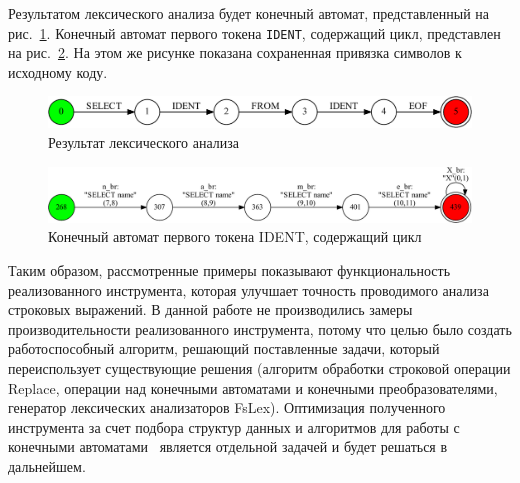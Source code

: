 Результатом лексического анализа будет конечный автомат, представленный на рис.~\ref{fig:TokenEx}. Конечный автомат первого токена \verb|IDENT|, содержащий цикл, представлен на рис.~\ref{fig:token}. На этом же рисунке показана сохраненная привязка символов к исходному коду. 
\begin{figure}[H]
\begin{center}
\includegraphics[width=1.0\textwidth]{Polubelova/TokenEx}
\caption{Результат лексического анализа}
\label{fig:TokenEx} 
\end{center}
\end{figure}
\begin{figure}[H]
\begin{center}
\includegraphics[width=1.0\textwidth]{Polubelova/token}
\caption{Конечный автомат первого токена IDENT, содержащий цикл}
\label{fig:token} 
\end{center}
\end{figure}

Таким образом, рассмотренные примеры показывают функциональность реализованного инструмента, которая улучшает точность проводимого анализа строковых выражений. В данной работе не производились замеры производительности реализованного инструмента, потому что целью было создать работоспособный алгоритм, решающий поставленные задачи, который переиспользует существующие решения (алгоритм обработки строковой операции Replace, операции над конечными автоматами и конечными преобразователями, генератор лексических анализаторов FsLex). Оптимизация полученного инструмента за счет подбора структур данных и алгоритмов для работы с конечными автоматами~\cite{AlgoFSA} является отдельной задачей и будет решаться в дальнейшем. 


